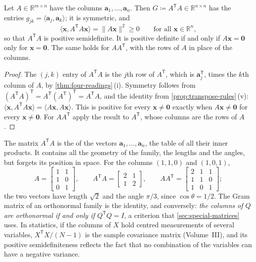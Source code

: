\begin{proposition}
\label{prop:gram}
Let $A\in\mathbb R^{m\times n}$ have the columns $\mathbf a_1,\ldots,\mathbf a_n$. Then $G\coloneqq A^{\mathsf T}A\in\mathbb R^{n\times n}$ has the entries $g_{jk}=\langle\mathbf a_j,\mathbf a_k\rangle$; it is symmetric, and
\[
\langle\mathbf x,A^{\mathsf T}A\mathbf x\rangle=\|A\mathbf x\|^2\ge0\qquad\text{for all }\mathbf x\in\mathbb R^n ,
\]
so that $A^{\mathsf T}A$ is positive semidefinite. It is positive definite if and only if $A\mathbf x=\mathbf 0$ only for $\mathbf x=\mathbf 0$. The same holds for $AA^{\mathsf T}$, with the rows of $A$ in place of the columns.
\end{proposition}

\begin{proof}
The $(j,k)$ entry of $A^{\mathsf T}A$ is the $j$th row of $A^{\mathsf T}$, which is $\mathbf a_j^{\mathsf T}$, times the $k$th column of $A$, by \cref{thm:four-readings}\,(i). Symmetry follows from $(A^{\mathsf T}A)^{\mathsf T}=A^{\mathsf T}(A^{\mathsf T})^{\mathsf T}=A^{\mathsf T}A$, and the identity from \cref{prop:transpose-rules}\,(v): $\langle\mathbf x,A^{\mathsf T}A\mathbf x\rangle=\langle A\mathbf x,A\mathbf x\rangle$. This is positive for every $\mathbf x\ne\mathbf 0$ exactly when $A\mathbf x\ne\mathbf 0$ for every $\mathbf x\ne\mathbf 0$. For $AA^{\mathsf T}$ apply the result to $A^{\mathsf T}$, whose columns are the rows of $A$.
\end{proof}

The matrix $A^{\mathsf T}A$ is the  of the vectors $\mathbf a_1,\ldots,\mathbf a_n$, the table of all their inner products. It contains all the geometry of the family, the lengths and the angles, but forgets its position in space. For the columns $(1,1,0)$ and $(1,0,1)$,
\[
A=\begin{bmatrix}1&1\\1&0\\0&1\end{bmatrix},\qquad A^{\mathsf T}A=\begin{bmatrix}2&1\\1&2\end{bmatrix},\qquad AA^{\mathsf T}=\begin{bmatrix}2&1&1\\1&1&0\\1&0&1\end{bmatrix};
\]
the two vectors have length $\sqrt2$ and the angle $\pi/3$, since $\cos\theta=1/2$. The Gram matrix of an orthonormal family is the identity, and conversely: \emph{the columns of $Q$ are orthonormal if and only if $Q^{\mathsf T}Q=I$}, a criterion that \cref{sec:special-matrices} uses. In statistics, if the columns of $X$ hold centred measurements of several variables, $X^{\mathsf T}X/(N-1)$ is the sample covariance matrix (Volume~III), and its positive semidefiniteness reflects the fact that no combination of the variables can have a negative variance.

